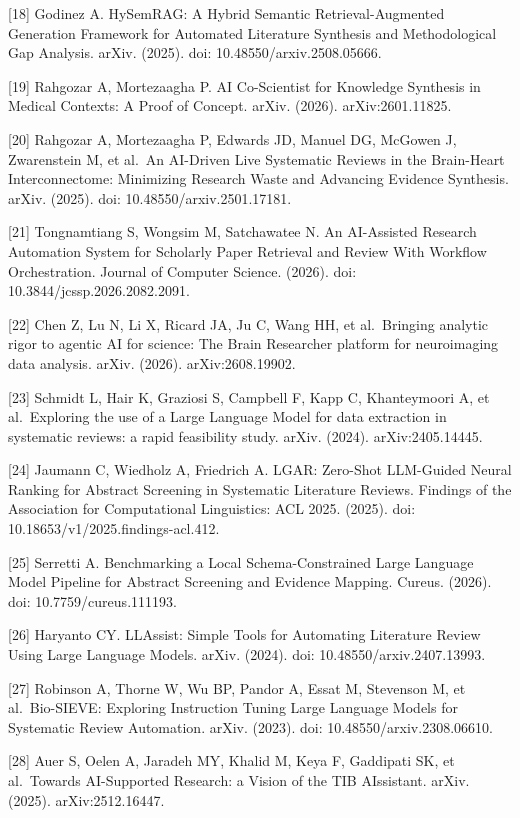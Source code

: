 \documentclass[11pt]{article}
\begin{document}
{[}18{]} Godinez A. HySemRAG: A Hybrid Semantic Retrieval-Augmented
Generation Framework for Automated Literature Synthesis and
Methodological Gap Analysis. arXiv. (2025). doi:
10.48550/arxiv.2508.05666.

{[}19{]} Rahgozar A, Mortezaagha P. AI Co-Scientist for Knowledge
Synthesis in Medical Contexts: A Proof of Concept. arXiv. (2026).
arXiv:2601.11825.

{[}20{]} Rahgozar A, Mortezaagha P, Edwards JD, Manuel DG, McGowen J,
Zwarenstein M, et al.~An AI-Driven Live Systematic Reviews in the
Brain-Heart Interconnectome: Minimizing Research Waste and Advancing
Evidence Synthesis. arXiv. (2025). doi: 10.48550/arxiv.2501.17181.

{[}21{]} Tongnamtiang S, Wongsim M, Satchawatee N. An AI-Assisted
Research Automation System for Scholarly Paper Retrieval and Review With
Workflow Orchestration. Journal of Computer Science. (2026). doi:
10.3844/jcssp.2026.2082.2091.

{[}22{]} Chen Z, Lu N, Li X, Ricard JA, Ju C, Wang HH, et al.~Bringing
analytic rigor to agentic AI for science: The Brain Researcher platform
for neuroimaging data analysis. arXiv. (2026). arXiv:2608.19902.

{[}23{]} Schmidt L, Hair K, Graziosi S, Campbell F, Kapp C, Khanteymoori
A, et al.~Exploring the use of a Large Language Model for data
extraction in systematic reviews: a rapid feasibility study. arXiv.
(2024). arXiv:2405.14445.

{[}24{]} Jaumann C, Wiedholz A, Friedrich A. LGAR: Zero-Shot LLM-Guided
Neural Ranking for Abstract Screening in Systematic Literature Reviews.
Findings of the Association for Computational Linguistics: ACL 2025.
(2025). doi: 10.18653/v1/2025.findings-acl.412.

{[}25{]} Serretti A. Benchmarking a Local Schema-Constrained Large
Language Model Pipeline for Abstract Screening and Evidence Mapping.
Cureus. (2026). doi: 10.7759/cureus.111193.

{[}26{]} Haryanto CY. LLAssist: Simple Tools for Automating Literature
Review Using Large Language Models. arXiv. (2024). doi:
10.48550/arxiv.2407.13993.

{[}27{]} Robinson A, Thorne W, Wu BP, Pandor A, Essat M, Stevenson M, et
al.~Bio-SIEVE: Exploring Instruction Tuning Large Language Models for
Systematic Review Automation. arXiv. (2023). doi:
10.48550/arxiv.2308.06610.

{[}28{]} Auer S, Oelen A, Jaradeh MY, Khalid M, Keya F, Gaddipati SK, et
al.~Towards AI-Supported Research: a Vision of the TIB AIssistant.
arXiv. (2025). arXiv:2512.16447.
\end{document}
